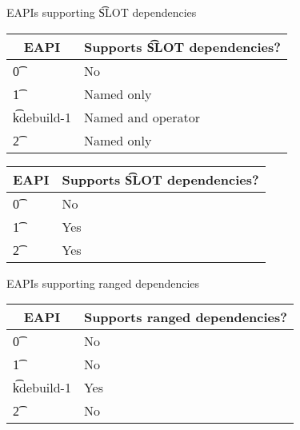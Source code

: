 \begin{centertable}{EAPIs supporting \t{SLOT} dependencies} \label{slot-deps-table}
\IFKDEBUILDELSE
{
    \begin{tabular}{ l l }
        \toprule
            \multicolumn{1}{c}{\textbf{EAPI}} &
            \multicolumn{1}{c}{\textbf{Supports \t{SLOT} dependencies?}} \\
            \midrule
    \t{0} & No \\
    \t{1} & Named only \\
    \t{kdebuild-1} & Named and operator \\
    \t{2} & Named only \\
    \bottomrule
    \end{tabular}
}{
    \begin{tabular}{ l l }
        \toprule
            \multicolumn{1}{c}{\textbf{EAPI}} &
            \multicolumn{1}{c}{\textbf{Supports \t{SLOT} dependencies?}} \\
            \midrule
    \t{0} & No \\
    \t{1} & Yes \\
    \t{2} & Yes \\
    \bottomrule
    \end{tabular}
}
\end{centertable}

\IFKDEBUILDELSE
{
    \begin{centertable}{EAPIs supporting ranged dependencies} \label{range-deps-table}
    \begin{tabular}{ l l }
        \toprule
        \multicolumn{1}{c}{\textbf{EAPI}} &
        \multicolumn{1}{c}{\textbf{Supports ranged dependencies?}} \\
        \midrule
    \t{0} & No \\
    \t{1} & No \\
    \t{kdebuild-1} & Yes \\
    \t{2} & No \\
    \bottomrule
    \end{tabular}
    \end{centertable}
}{
}

